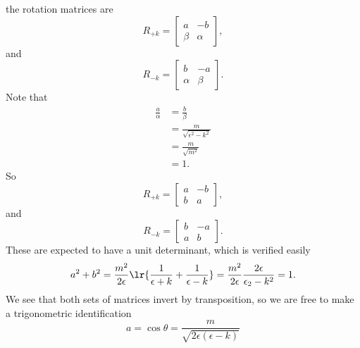 %
the rotation matrices are
%
\begin{dmath}\label{eqn:gradQuantumProblemSet4Problem3:320}
R_{+k}
=
\begin{bmatrix}
a & - b \\
\beta & \alpha
\end{bmatrix},
\end{dmath}
%
and
\begin{dmath}\label{eqn:gradQuantumProblemSet4Problem3:340}
R_{-k}
=
\begin{bmatrix}
b & -a \\
\alpha & \beta
\end{bmatrix}.
\end{dmath}
%
Note that
\begin{equation}\label{eqn:gradQuantumProblemSet4Problem3:360}
\begin{aligned}
\frac{a}{\alpha} &= \frac{b}{\beta} \\
&= \frac{m}{\sqrt{\epsilon^2 - k^2}}  \\
&= \frac{m}{\sqrt{m^2}}  \\
&= 1.
\end{aligned}
\end{equation}
%
So
\begin{dmath}\label{eqn:gradQuantumProblemSet4Problem3:380}
R_{+k}
=
\begin{bmatrix}
a & - b \\
b & a
\end{bmatrix},
\end{dmath}
%
and
\begin{dmath}\label{eqn:gradQuantumProblemSet4Problem3:400}
R_{-k}
=
\begin{bmatrix}
b & -a \\
a & b
\end{bmatrix}.
\end{dmath}
%
These are expected to have a unit determinant, which is verified easily
%
\begin{dmath}\label{eqn:gradQuantumProblemSet4Problem3:420}
a^2 + b^2
=
\frac{m^2}{2 \epsilon}
\lr{
\frac{1}{\epsilon + k}
+
\frac{1}{\epsilon - k}
}
=
\frac{m^2}{2 \epsilon}
\frac{2 \epsilon}{\epsilon_2 - k^2}
= 1.
\end{dmath}
%
We see that both sets of matrices invert by transposition, so we are free to make a trigonometric identification
%
\begin{equation}\label{eqn:gradQuantumProblemSet4Problem3:440}
a = \cos\theta
=
\frac{m}{\sqrt{2\epsilon(\epsilon - k)}}
\end{equation}
